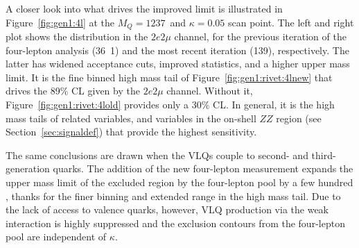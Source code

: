 A closer look into what drives the improved limit is illustrated in Figure~\ref{fig:gen1:4l} at the $M_Q=1237$~\GeV and $\kappa=0.05$ scan point. The left and right plot shows the \mFourL{} distribution in the $2e2\mu$ channel, for the previous iteration of the four-lepton analysis (\unit{36.1}{\invfb}) and the most recent iteration (\unit{139}{\invfb}), respectively. The latter has widened acceptance cuts, improved statistics, and a higher upper mass limit. It is the fine binned high mass tail of Figure~\ref{fig:gen1:rivet:4lnew} that drives the 89\% CL given by the $2e2\mu$ channel. Without it, Figure~\ref{fig:gen1:rivet:4lold} provides only a 30\% CL. In general, it is the high mass tails of \mFourL{} related variables, and variables in the on-shell $ZZ$ region (see Section~\ref{sec:signaldef}) that provide the highest sensitivity. 

The same conclusions are drawn when the VLQs couple to second- and third-generation quarks. The addition of the new four-lepton measurement expands the upper mass limit of the excluded region by the four-lepton pool by a few hundred \GeV, thanks for the finer binning and extended range in the high mass tail. Due to the lack of access to valence quarks, however, VLQ production via the weak interaction is highly suppressed and the exclusion contours from the four-lepton pool are independent of $\kappa$. 

